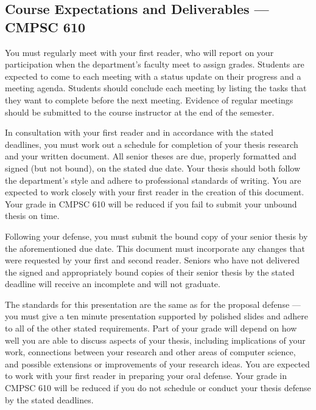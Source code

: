 \subsection*{Course Expectations and Deliverables --- CMPSC 610}


\medskip
{} You must regularly meet with your first reader, who will report on your participation when
the department's faculty meet to assign grades.  Students are expected to come to each meeting with a status update on
their progress and a meeting agenda.  Students should conclude each meeting by listing the tasks that they want to
complete before the next meeting. Evidence of regular meetings should be submitted to the course instructor at the end
of the semester. 

% 



\medskip
{} In consultation with your first reader and in accordance with the stated deadlines, you
must work out a schedule for completion of your thesis research and your written document. All senior theses are due,
properly formatted and signed (but not bound), on the stated due date. 	Your thesis should both follow the department's
style and adhere to professional standards of writing. You are expected to work closely with your first reader in the
creation of this document.  Your grade in CMPSC 610 will be reduced if you fail to submit your unbound thesis on time.

Following your defense, you must submit the bound copy of your senior thesis by the aforementioned due date.  This
document must incorporate any changes that were requested by your first and second reader. Seniors who have not
delivered the signed and appropriately bound copies of their senior thesis by the stated deadline will receive an
incomplete and will not graduate.

\medskip 
{} The standards for this presentation are the same as for the proposal defense ---  you
must give a ten minute presentation supported by polished slides and adhere to all of the other stated requirements.
Part of your grade will depend on how well you are able to discuss aspects of your thesis, including implications of
your work, connections between your research and other areas of computer science, and possible extensions or
improvements of your research ideas.  You are expected to work with your first reader in preparing your oral defense.
Your grade in CMPSC 610 will be reduced if you do not schedule or conduct your thesis defense by the stated deadlines.

